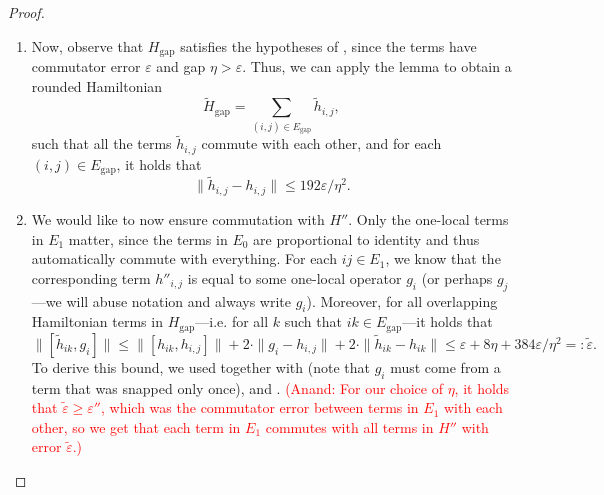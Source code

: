 \documentclass[11pt]{article}
\newcommand{\gap}{\mathrm{gap}}
\renewcommand{\deg}{\mathrm{deg}}
\theoremstyle{plain}
\newcommand{\eps}{\varepsilon}
\newcommand{\AnandNote}[1]{\textcolor{red}{(Anand: #1)}}
\newcommand{\AnandNote}[1]{}
\begin{document}
\begin{proof}
\begin{enumerate}
   Define
    \[ H'' = \sum_{(i,j) \in E_{\deg}} h''_{i,j}. \]
    Now, although this is formally a two-local Hamiltonian, in reality every term in $H''$ is either 1-local or zero-local (proportional to identity). Let $E_1$ be the set of edges corresponding to terms that are actually 1-local, and $E_0$ be the set of edges corresponding to terms that are proportional to identity, and define
    \begin{align*}
        H''_1 &= \sum_{(i,j) \in E_1} h''_{i,j} \\
        H''_0 &= \sum_{(i,j) \in E_0} h''_{i,j} \\
        H'' &= H''_1 + H''_0.
    \end{align*}
    
    Within $H_{\gap}$, all pairs of terms have a commutator bounded by $\eps$ in norm, since these terms are unchanged from $H$. Moreover, by construction, all terms in $H_{\gap}$ \emph{and} $H''$ are $\eta$-gapped on both qubits they touch (if not proportional to identity). However, the terms in $H''$ may have commutator error up to $\eps'' := \eps + 16\eta$ with each other or with terms in $H_{\gap}$, by  and . 
    
    \item Now, observe that $H_{\gap}$ satisfies the hypotheses of , since the terms have commutator error $\eps$ and gap $\eta > \eps$. Thus, we can apply the lemma to obtain a rounded Hamiltonian
    \[\tilde{H}_{\gap} = \sum_{(i,j) \in E_{\gap}} \tilde{h}_{i,j}, \]
    such that all the terms $\tilde{h}_{i,j}$ commute with each other, and for each $(i,j) \in E_{\gap}$, it holds that
    \begin{equation} 
    \label{eq:tilde-h-to-h} \| \tilde{h}_{i,j} - h_{i,j} \| \leq 192 \eps/\eta^2. \end{equation}
    \item 
    We would like to now ensure commutation with $H''$. Only the one-local terms in $E_1$ matter, since the terms in $E_0$ are proportional to identity and thus automatically commute with everything. For each $ij \in E_1$, we know that the corresponding term $h''_{i,j}$ is equal to some one-local operator $g_i$ (or perhaps $g_j$---we will abuse notation and always write $g_i$). Moreover, for all overlapping Hamiltonian terms in $H_{\gap}$---i.e. for all $k$ such that $ik \in E_{\gap}$---it holds that
    \[ \| [\tilde{h}_{ik}, g_i] \| \leq \|[h_{ik}, h_{i,j}]\| + 2\cdot \|g_i - h_{i,j}\| + 2 \cdot \| \tilde{h}_{ik} - h_{ik}\| \leq  \eps +  8\eta + 384 \eps/\eta^2 =: \tilde{\eps}. \]
    To derive this bound, we used  together with  (note that $g_i$ must come from a term that was snapped only once), and . \AnandNote{For our choice of $\eta$, it holds that $\tilde{\eps} \geq \eps''$, which was the commutator error between terms in $E_1$ with each other, so we get that each term in $E_1$ commutes with all terms in $H''$ with error $\tilde{\eps}$.}


\end{enumerate}
\end{proof}
\end{document}
